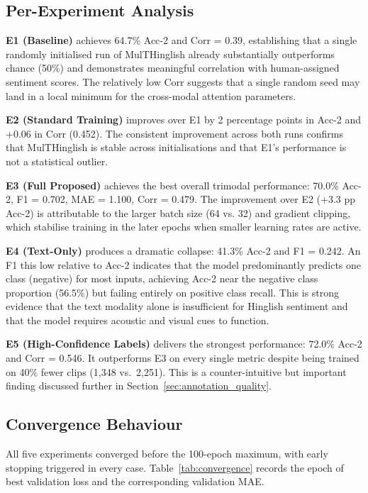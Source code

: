 \subsection{Per-Experiment Analysis}

\textbf{E1 (Baseline)} achieves 64.7\% Acc-2 and Corr = 0.39, establishing that a single randomly initialised run of MulTHinglish already substantially outperforms chance (50\%) and demonstrates meaningful correlation with human-assigned sentiment scores. The relatively low Corr suggests that a single random seed may land in a local minimum for the cross-modal attention parameters.

\textbf{E2 (Standard Training)} improves over E1 by 2 percentage points in Acc-2 and +0.06 in Corr (0.452). The consistent improvement across both runs confirms that MulTHinglish is stable across initialisations and that E1's performance is not a statistical outlier.

\textbf{E3 (Full Proposed)} achieves the best overall trimodal performance: 70.0\% Acc-2, F1 = 0.702, MAE = 1.100, Corr = 0.479. The improvement over E2 (+3.3 pp Acc-2) is attributable to the larger batch size (64 vs. 32) and gradient clipping, which stabilise training in the later epochs when smaller learning rates are active.

\textbf{E4 (Text-Only)} produces a dramatic collapse: 41.3\% Acc-2 and F1 = 0.242. An F1 this low relative to Acc-2 indicates that the model predominantly predicts one class (negative) for most inputs, achieving Acc-2 near the negative class proportion (56.5\%) but failing entirely on positive class recall. This is strong evidence that the text modality alone is insufficient for Hinglish sentiment and that the model requires acoustic and visual cues to function.

\textbf{E5 (High-Confidence Labels)} delivers the strongest performance: 72.0\% Acc-2 and Corr = 0.546. It outperforms E3 on every single metric despite being trained on 40\% fewer clips (1,348 vs.\ 2,251). This is a counter-intuitive but important finding discussed further in Section~\ref{sec:annotation_quality}.

\subsection{Convergence Behaviour}

All five experiments converged before the 100-epoch maximum, with early stopping triggered in every case. Table~\ref{tab:convergence} records the epoch of best validation loss and the corresponding validation MAE.


